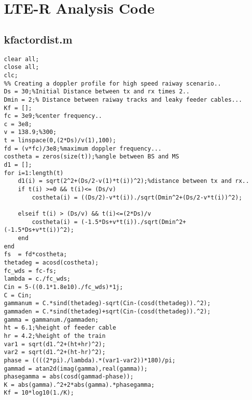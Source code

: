\chapter{LTE-R Analysis Code}
\section{kfactordist.m}
\begin{lstlisting}[breaklines]
% Calculating K-factor for the tunnel environment for HST
clear all;
close all;
clc;
%% Creating a doppler profile for high speed raiway scenario..
Ds = 30;%Initial Distance between tx and rx times 2..
Dmin = 2;% Distance between raiway tracks and leaky feeder cables...
Kf = [];
fc = 3e9;%center frequency..
c = 3e8;
v = 138.9;%300;
t = linspace(0,(2*Ds)/v(1),100);
fd = (v*fc)/3e8;%maximum doppler frequency...
costheta = zeros(size(t));%angle between BS and MS
d1 = [];
for i=1:length(t)
    d1(i) = sqrt(2^2+(Ds/2-v(1)*t(i))^2);%distance between tx and rx..
    if t(i) >=0 && t(i)<= (Ds/v)
        costheta(i) = ((Ds/2)-v*t(i))./sqrt(Dmin^2+(Ds/2-v*t(i))^2);
    
    elseif t(i) > (Ds/v) && t(i)<=(2*Ds)/v
        costheta(i) = (-1.5*Ds+v*t(i))./sqrt(Dmin^2+(-1.5*Ds+v*t(i))^2);
    end  
end
fs  = fd*costheta;
thetadeg = acosd(costheta);
fc_wds = fc-fs;
lambda = c./fc_wds;
Cin = 5-((0.1*1.8e10)./fc_wds)*1j;
C = Cin;
gammanum = C.*sind(thetadeg)-sqrt(Cin-(cosd(thetadeg)).^2);
gammaden = C.*sind(thetadeg)+sqrt(Cin-(cosd(thetadeg)).^2);
gamma = gammanum./gammaden;
ht = 6.1;%height of feeder cable
hr = 4.2;%height of the train
var1 = sqrt(d1.^2+(ht+hr)^2);
var2 = sqrt(d1.^2+(ht-hr)^2);
phase = ((((2*pi)./lambda).*(var1-var2))*180)/pi;
gammad = atan2d(imag(gamma),real(gamma));
phasegamma = abs(cosd(gammad-phase));
K = abs(gamma).^2+2*abs(gamma).*phasegamma;
Kf = 10*log10(1./K);
\end{lstlisting}

